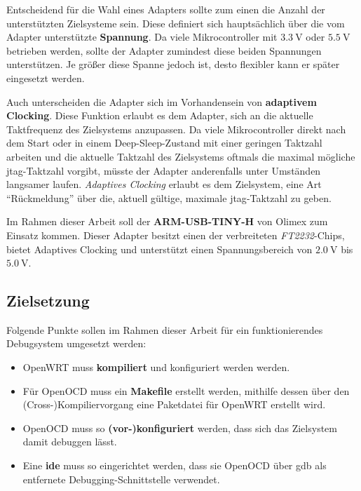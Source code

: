 Entscheidend für die Wahl eines Adapters sollte zum einen die Anzahl der
unterstützten Zielsysteme sein. Diese definiert sich hauptsächlich über die
vom Adapter unterstützte \textbf{Spannung}. Da viele Mikrocontroller mit
$\SI{3.3}{\volt}$ oder $\SI{5.5}{\volt}$ betrieben werden, sollte der Adapter
zumindest diese beiden Spannungen unterstützen. Je größer diese Spanne jedoch ist, desto flexibler kann
er später eingesetzt werden.

Auch unterscheiden die Adapter sich im Vorhandensein von \textbf{adaptivem
Clocking}. Diese Funktion erlaubt es dem Adapter, sich an die aktuelle
Taktfrequenz des Zielsystems anzupassen. Da viele Mikrocontroller direkt nach
dem Start oder in einem Deep-Sleep-Zustand mit einer geringen Taktzahl arbeiten
und die aktuelle Taktzahl des Zielsystems oftmals die maximal mögliche
\gls{jtag}-Taktzahl vorgibt, müsste der Adapter anderenfalls unter Umständen langsamer
laufen. \emph{Adaptives Clocking} erlaubt es dem Zielsystem, eine Art
"`Rückmeldung"' über die, aktuell gültige, maximale \gls{jtag}-Taktzahl zu geben.

Im Rahmen dieser Arbeit soll der \textbf{ARM-USB-TINY-H} von Olimex zum Einsatz
kommen.
Dieser Adapter besitzt einen der verbreiteten \emph{FT2232}-Chips, bietet
Adaptives Clocking und unterstützt einen Spannungsbereich von $\SI{2.0}{\volt}$
bis $\SI{5.0}{\volt}$.

\subsection{Zielsetzung}
Folgende Punkte sollen im Rahmen dieser Arbeit für ein funktionierendes
Debugsystem umgesetzt werden:
\begin{itemize}
  \item OpenWRT muss \textbf{kompiliert} und konfiguriert werden werden.
  \item Für OpenOCD muss ein \textbf{Makefile} erstellt werden, mithilfe
  dessen über den \linebreak(Cross-)Kompiliervorgang eine Paketdatei für
  OpenWRT erstellt wird.
  \item OpenOCD muss so \textbf{(vor-)konfiguriert} werden, dass sich das
  Zielsystem damit debuggen lässt.
  \item Eine \textbf{\gls{ide}} muss so eingerichtet werden, dass sie OpenOCD
  über \gls{gdb} als entfernete Debugging-Schnittstelle verwendet.
\end{itemize}

